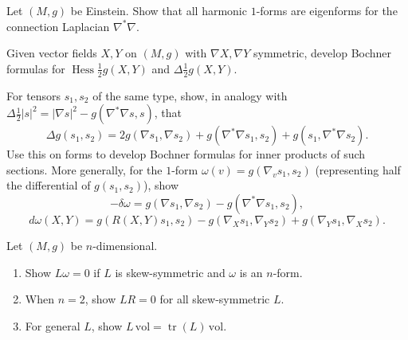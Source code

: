 \begin{remark}[Exercise 9.6.7]
  \label{rem:pet-ch9-exercise-9-6-7}
  Let $(M,g)$ be Einstein. Show that all harmonic $1$-forms are eigenforms for
  the connection Laplacian $\nabla^*\nabla$.
\end{remark}

\begin{remark}[Exercise 9.6.8]
  \label{rem:pet-ch9-exercise-9-6-8}
  Given vector fields $X,Y$ on $(M,g)$ with $\nabla X,\nabla Y$ symmetric,
  develop Bochner formulas for $\operatorname{Hess}\tfrac12g(X,Y)$ and
  $\Delta\tfrac12g(X,Y)$.
\end{remark}

\begin{remark}[Exercise 9.6.9]
  \label{rem:pet-ch9-exercise-9-6-9}
  For tensors $s_1,s_2$ of the same type, show, in analogy with
  $\Delta\tfrac12|s|^2=|\nabla s|^2-g(\nabla^*\nabla s,s)$, that
  \[
    \Delta g(s_1,s_2)=2g(\nabla s_1,\nabla s_2)+g(\nabla^*\nabla s_1,s_2)
    +g(s_1,\nabla^*\nabla s_2).
  \]
  Use this on forms to develop Bochner formulas for inner products of such
  sections. More generally, for the $1$-form $\omega(v)=g(\nabla_vs_1,s_2)$
  (representing half the differential of $g(s_1,s_2)$), show
  \[
    -\delta\omega=g(\nabla s_1,\nabla s_2)-g(\nabla^*\nabla s_1,s_2),
  \]
  \[
    d\omega(X,Y)=g(R(X,Y)s_1,s_2)-g(\nabla_Xs_1,\nabla_Ys_2)+g(\nabla_Ys_1,\nabla_Xs_2).
  \]
\end{remark}

\begin{remark}[Exercise 9.6.10]
  \label{rem:pet-ch9-exercise-9-6-10}
  Let $(M,g)$ be $n$-dimensional.
  \begin{enumerate}
    \item[(1)] Show $L\omega=0$ if $L$ is skew-symmetric and $\omega$ is an
      $n$-form.
    \item[(2)] When $n=2$, show $LR=0$ for all skew-symmetric $L$.
    \item[(3)] For general $L$, show $L\,\mathrm{vol}=\operatorname{tr}(L)\,\mathrm{vol}$.
  \end{enumerate}
\end{remark}

